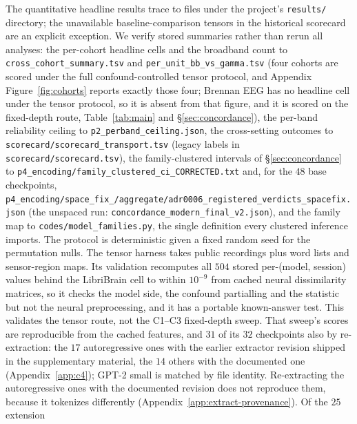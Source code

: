 \documentclass{article}
\begin{document}
The quantitative headline results trace to files under the project's
\texttt{results/} directory; the unavailable baseline-comparison tensors in the historical
scorecard are an explicit exception. We verify stored summaries rather than rerun all analyses: the per-cohort headline cells and the broadband count to
\texttt{cross\_cohort\_summary.tsv} and \texttt{per\_unit\_bb\_vs\_gamma.tsv} (four
cohorts are scored under the full confound-controlled tensor protocol, and
Appendix Figure~\ref{fig:cohorts} reports exactly those four; Brennan EEG has no headline cell
under the tensor protocol, so it is absent from that figure, and it is scored on the fixed-depth
route, Table~\ref{tab:main} and \S\ref{sec:concordance}),
the per-band reliability ceiling to \texttt{p2\_perband\_ceiling.json}, the
cross-setting outcomes to \texttt{scorecard/\allowbreak scorecard\_\allowbreak transport.tsv} (legacy labels in
\texttt{scorecard/scorecard.tsv}), the family-clustered intervals of
\S\ref{sec:concordance} to \texttt{p4\_\allowbreak encoding/\allowbreak family\_\allowbreak clustered\_\allowbreak ci\_\allowbreak CORRECTED.txt} and, for the $48$ base checkpoints,
\texttt{p4\_\allowbreak encoding/\allowbreak space\_\allowbreak fix\_/\allowbreak aggregate/\allowbreak adr0006\_\allowbreak registered\_\allowbreak verdicts\_\allowbreak spacefix.json} (the
unspaced run: \texttt{concordance\_modern\_final\_v2.json}), and the family map to
\texttt{codes/model\_families.py}, the single definition every clustered inference imports. The protocol is deterministic
given a fixed random seed for the permutation nulls. The tensor harness takes public recordings
plus word lists and sensor-region maps. Its validation recomputes all $504$ stored per-(model,
session) values behind the LibriBrain cell to within $10^{-9}$ from cached neural dissimilarity
matrices, so it checks the model side, the confound partialling and the statistic but not the
neural preprocessing, and it has a portable known-answer test. This validates the tensor route, not
the C1--C3 fixed-depth sweep. That sweep's scores are reproducible from the cached features, and $31$ of its $32$ checkpoints
also by re-extraction: the $17$ autoregressive ones with the earlier extractor revision shipped in
the supplementary material, the $14$ others with the documented one (Appendix~\ref{app:c4}); GPT-2
small is matched by file identity. Re-extracting the autoregressive ones with the documented
revision does not reproduce them, because it tokenizes differently
(Appendix~\ref{app:extract-provenance}). Of the $25$ extension
\end{document}
